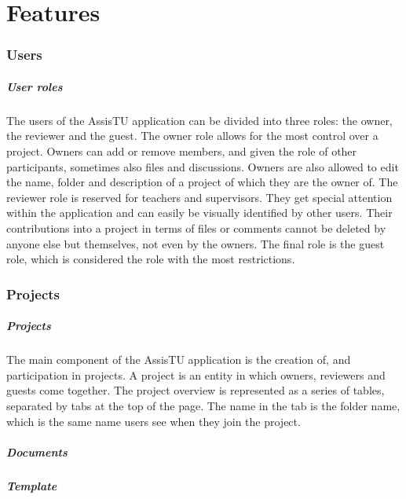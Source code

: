 \chapter{Features}

\subsection{Users}

\paragraph{User roles}

The users of the AssisTU application can be divided into three roles: the owner, the reviewer and the guest. The owner role allows for the most control over a project. 
Owners can add or remove members, and given the role of other participants, sometimes also files and discussions. Owners are also allowed to edit the name, folder and description of a project of which they are the owner of. 
The reviewer role is reserved for teachers and supervisors. They get special attention within the application and can easily be visually identified by other users. Their contributions into a project in terms of files or comments cannot be deleted by anyone else but themselves, not even by the owners. 
The final role is the guest role, which is considered the role with the most restrictions.

\subsection{Projects}

\paragraph{Projects}

The main component of the AssisTU application is the creation of, and participation in projects. A project is an entity in which owners, reviewers and guests come together. 
The project overview is represented as a series of tables, separated by tabs at the top of the page. The name in the tab is the folder name, which is the same name users see when they join the project. 

\paragraph{Documents}

\paragraph{Template}

